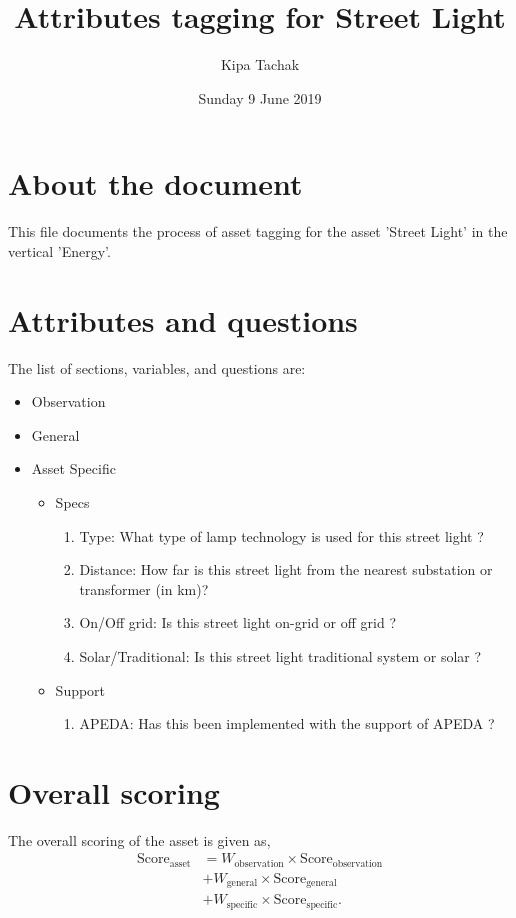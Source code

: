 \documentclass[oneside,twocolumn]{article}
\title{Attributes tagging for Street Light}
\author{Kipa Tachak}
\date{Sunday  9 June 2019}
\newcommand{\tsub}[2]{\text{#1}_{\text{#2}}}
\newcommand{\tsubb}[2]{#1_{\text{#2}}}
\begin{document}
\maketitle

\section{About the document}
This file documents the process of asset tagging for the asset 'Street Light' in the
vertical 'Energy'.

\section{Attributes and questions}
The list of sections, variables, and questions are:
    \begin{itemize}
    \item Observation
    \item General
    \item Asset Specific
    \begin{itemize}
\item Specs
\begin{enumerate}
\item Type: What type of lamp technology is used for this street light ?
\item Distance: How far is this street light from the nearest substation or transformer (in km)?
\item On/Off grid: Is this street light on-grid or off grid ?
\item Solar/Traditional: Is this street light traditional system or solar ?
\end{enumerate}

\item Support
\begin{enumerate}
\item APEDA: Has this been implemented with the support of APEDA  ?
\end{enumerate}

\end{itemize}

    \end{itemize}
\section{Overall scoring}
The overall scoring of the asset is given as,
\begin{align*}
	\tsub{Score}{asset} &= \tsubb{W}{observation} \times \tsub{Score}{observation} \\
	&+ \tsubb{W}{general} \times \tsub{Score}{general} \\
	&+ \tsubb{W}{specific} \times \tsub{Score}{specific}.
\end{align*}
\end{document}
